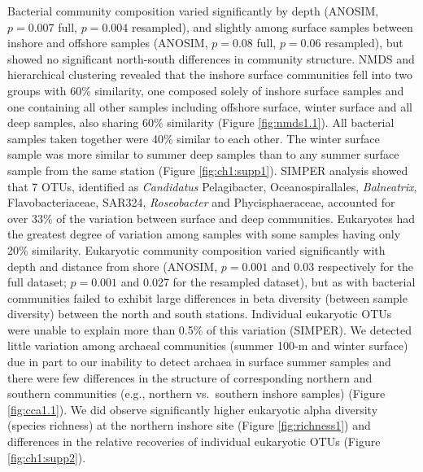 Bacterial community composition varied significantly by depth (ANOSIM, $p = 0.007$ full, $p = 0.004$ resampled), and slightly among surface samples between inshore and offshore samples (ANOSIM, $p = 0.08$ full, $p = 0.06$ resampled), but showed no significant north-south differences in community structure. NMDS and hierarchical clustering revealed that the inshore surface communities fell into two groups with 60\% similarity, one composed solely of inshore surface samples and one containing all other samples including offshore surface, winter surface and all deep samples, also sharing 60\% similarity (Figure \ref{fig:nmds1.1}). All bacterial samples taken together were 40\% similar to each other. The winter surface sample was more similar to summer deep samples than to any summer surface sample from the same station (Figure \ref{fig:ch1:supp1}). SIMPER analysis showed that 7 OTUs, identified as \textit{Candidatus} Pelagibacter, Oceanospirallales, \textit{Balneatrix}, Flavobacteriaceae, SAR324, \textit{Roseobacter} and Phycisphaeraceae, accounted for over 33\% of the variation between surface and deep communities. Eukaryotes had the greatest degree of variation among samples with some samples having only 20\% similarity. Eukaryotic community composition varied significantly with depth and distance from shore (ANOSIM, $p = 0.001$ and 0.03 respectively for the full dataset; $p= 0.001$ and 0.027 for the resampled dataset), but as with bacterial communities failed to exhibit large differences in beta diversity (between sample diversity) between the north and south stations. Individual eukaryotic OTUs were unable to explain more than 0.5\% of this variation (SIMPER). We detected little variation among archaeal communities (summer 100-m and winter surface) due in part to our inability to detect archaea in surface summer samples and there were few differences in the structure of corresponding northern and southern communities (e.g., northern vs.~southern inshore samples) (Figure \ref{fig:cca1.1}). We did observe significantly higher eukaryotic alpha diversity (species richness) at the northern inshore site (Figure \ref{fig:richness1}) and differences in the relative recoveries of individual eukaryotic OTUs (Figure \ref{fig:ch1:supp2}).

